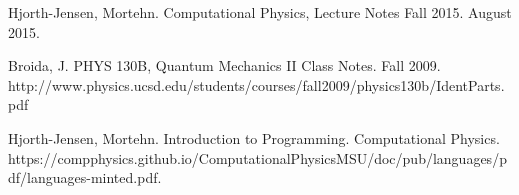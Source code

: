 \documentclass[%
oneside,                 %
final,                   %
10pt]{article}
\begin{document}
\begin{thebibliography}{9}

Hjorth-Jensen, Mortehn. 
Computational Physics, Lecture Notes Fall 2015. 
August 2015.


Broida, J.
PHYS 130B, Quantum Mechanics II Class Notes.
Fall 2009.
http://www.physics.ucsd.edu/students/courses/fall2009/physics130b/IdentParts.pdf

Hjorth-Jensen, Mortehn. 
Introduction to Programming. 
Computational Physics.
https://compphysics.github.io/ComputationalPhysicsMSU/doc/pub/languages/pdf/languages-minted.pdf.

\end{thebibliography}



\end{document}
